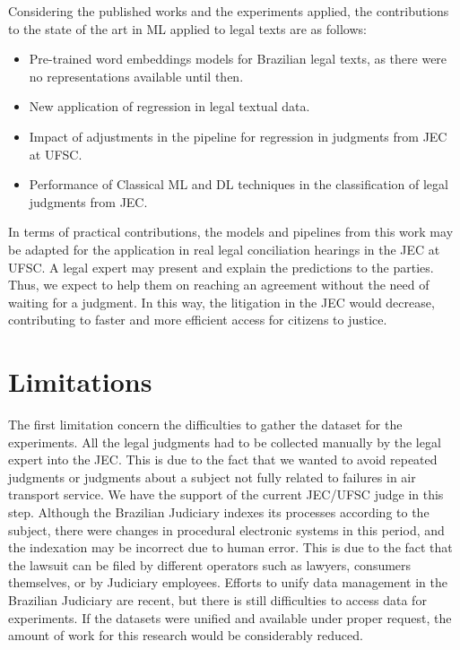 Considering the published works and the experiments applied, the contributions to the state of the art in \gls{ML} applied to legal texts are as follows:

\begin{itemize}[noitemsep]
    \item Pre-trained word embeddings models for Brazilian legal texts, as there were no representations available until then.
    \item New application of regression in legal textual data.
    \item Impact of adjustments in the pipeline for regression in judgments from \gls{JEC} at \gls{UFSC}.
    \item Performance of Classical \gls{ML} and \gls{DL} techniques in the classification of legal judgments from \gls{JEC}.
\end{itemize}


In terms of practical contributions, the models and pipelines from this work may be adapted for the application in real legal conciliation hearings in the \gls{JEC} at \gls{UFSC}. A legal expert may present and explain the predictions to the parties. Thus, we expect to help them on reaching an agreement without the need of waiting for a judgment. In this way, the litigation in the \gls{JEC} would decrease, contributing to faster and more efficient access for citizens to justice.



\section{Limitations}

The first limitation concern the difficulties to gather the dataset for the experiments. All the legal judgments had to be collected manually by the legal expert into the \gls{JEC}. This is due to the fact that we wanted to avoid repeated judgments or judgments about a subject not fully related to failures in air transport service. We have the support of the current \gls{JEC}/\gls{UFSC} judge in this step. Although the Brazilian Judiciary indexes its processes according to the subject, there were changes in procedural electronic systems in this period, and the indexation may be incorrect due to human error. This is due to the fact that the lawsuit can be filed by different operators such as lawyers, consumers themselves, or by Judiciary employees. Efforts to unify data management in the Brazilian Judiciary are  recent, but there is still difficulties to access data for experiments. If the datasets were unified and available under proper request, the amount of work for this research would be considerably reduced.

